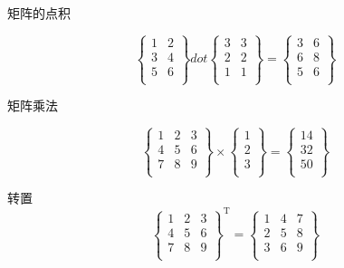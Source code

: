 \documentclass[UTF8,12pt]{ctexart}
\begin{document}
矩阵的点积

{\color{white} 
$$
\left\{
 \begin{matrix}
   1 & 2\\
   3 & 4\\
   5 & 6\\
  \end{matrix}
  \right\} dot 
\left\{
 \begin{matrix}
   3 & 3\\
   2 & 2\\
   1 & 1\\
  \end{matrix}
  \right\}=\left\{
 \begin{matrix}
   3 & 6\\
   6 & 8\\
   5 & 6\\
  \end{matrix}
  \right\}
$$
 }

矩阵乘法

{\color{white} 
$$
\left\{
 \begin{matrix}
   1 & 2 & 3\\
   4 & 5 & 6\\
   7 & 8 & 9\\
  \end{matrix}
  \right\} \times 
\left\{
 \begin{matrix}
   1\\
   2\\
   3\\
  \end{matrix}
  \right\}=\left\{
 \begin{matrix}
   14\\
   32\\
   50\\
  \end{matrix}
  \right\}
$$
 }

转置
{\color{white} 
$$
\left\{
 \begin{matrix}
   1 & 2 & 3\\
   4 & 5 & 6\\
   7 & 8 & 9\\
  \end{matrix}
  \right\}^\mathrm{T} =\left\{
 \begin{matrix}
    1 & 4 & 7\\
   2 & 5 & 8\\
   3 & 6 & 9\\
  \end{matrix}
  \right\}
$$
 }
\end{document}
